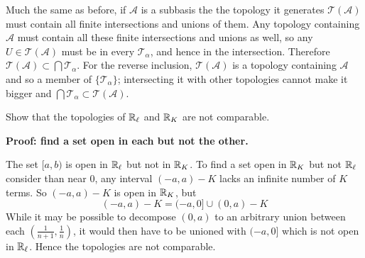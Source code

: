 \documentclass{article}
\begin{document}

Much the same as before, if $\mathscr{A}$ is a subbasis the the topology it generates $\mathscr{T}(\mathscr{A})$ must contain all finite intersections and unions of them. Any topology containing $\mathscr{A}$ must contain all these finite intersections and unions as well, so any $U \in \mathscr{T}(\mathscr{A})$ must be in every $\mathscr{T}_\alpha$, and hence in the intersection. Therefore $\mathscr{T}(\mathscr{A}) \subset \bigcap \mathscr{T}_\alpha$. For the reverse inclusion, $\mathscr{T}(\mathscr{A})$ is a topology containing $\mathscr{A}$ and so a member of $\{\mathscr{T}_\alpha\}$; intersecting it with other topologies cannot make it bigger and $\bigcap \mathscr{T}_\alpha \subset \mathscr{T}(\mathscr{A})$.

\begin{problem}
Show that the topologies of $\mathbb{R}_\ell$ and $\mathbb{R}_K$ are not comparable.
\end{problem}

\textbf{Proof: find a set open in each but not the other.}

The set $[a, b)$ is open in $\mathbb{R}_\ell$ but not in $\mathbb{R}_K$. To find a set open in $\mathbb{R}_K$ but not $\mathbb{R}_\ell$ consider than near 0, any interval $(-a, a) - K$ lacks an infinite number of $K$ terms. So $(-a, a) - K$ is open in $\mathbb{R}_K$, but
    $$(-a, a) - K = (-a, 0] \cup (0, a) -K$$
While it may be possible to decompose $(0, a)$ to an arbitrary union between each $(\frac{1}{n+1}, \frac{1}{n})$, it would then have to be unioned with $(-a, 0]$ which is not open in $\mathbb{R}_\ell$. Hence the topologies are not comparable.
\end{document}
